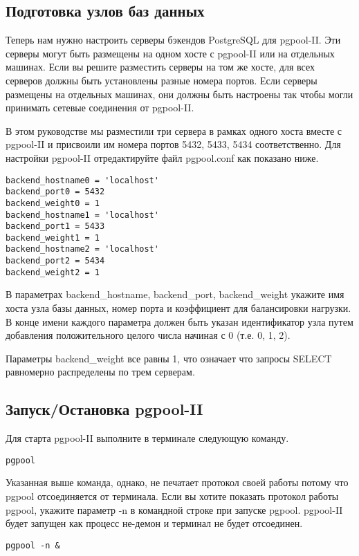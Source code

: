\subsection{Подготовка узлов баз данных}
Теперь нам нужно настроить серверы бэкендов PostgreSQL для pgpool-II. Эти серверы могут быть размещены на одном 
хосте с pgpool-II или на отдельных машинах. Если вы решите разместить серверы на том же хосте, для всех серверов 
должны быть установлены разные номера портов. Если серверы размещены на отдельных машинах, они должны быть настроены 
так чтобы могли принимать сетевые соединения от pgpool-II.

В этом руководстве мы разместили три сервера в рамках одного хоста вместе с pgpool-II и присвоили им номера портов 
5432, 5433, 5434 соответственно. Для настройки pgpool-II отредактируйте файл pgpool.conf как показано ниже.
\begin{lstlisting}[label=lst:pgpool10,caption=Подготовка узлов баз данных]
backend_hostname0 = 'localhost'
backend_port0 = 5432
backend_weight0 = 1
backend_hostname1 = 'localhost'
backend_port1 = 5433
backend_weight1 = 1
backend_hostname2 = 'localhost'
backend_port2 = 5434
backend_weight2 = 1
\end{lstlisting}

В параметрах backend\_hostname, backend\_port, backend\_weight укажите имя хоста узла базы данных, номер порта и 
коэффициент для балансировки нагрузки. В конце имени каждого параметра должен быть указан идентификатор узла путем 
добавления положительного целого числа начиная с 0 (т.е. 0, 1, 2).

Параметры backend\_weight все равны 1, что означает что запросы SELECT равномерно распределены по трем серверам.

\subsection{Запуск/Остановка pgpool-II}
Для старта pgpool-II выполните в терминале следующую команду.
\begin{lstlisting}[label=lst:pgpool11,caption=Запуск]
pgpool
\end{lstlisting}

Указанная выше команда, однако, не печатает протокол своей работы потому что pgpool отсоединяется от терминала. 
Если вы хотите показать протокол работы pgpool, укажите параметр -n в командной строке при запуске pgpool. 
pgpool-II будет запущен как процесс не-демон и терминал не будет отсоединен.
\begin{lstlisting}[label=lst:pgpool12,caption=Запуск]
pgpool -n &
\end{lstlisting}

